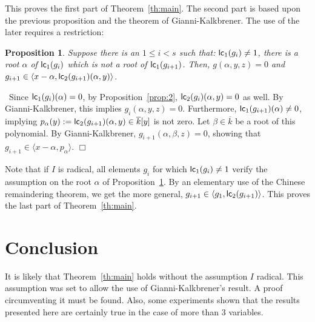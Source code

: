 \documentclass[a4paper,11pt]{article}
\newcommand{\conj}[1]{\ensuremath{{\overline{#1}}}}
\newcommand{\proof}{\noindent {\sc Proof:}~}
\newcommand{\foorp}{\hfill $\Box$}
\def\lc{\ensuremath{{\sf lc}}}
\def\l{\ensuremath{\langle}}
\def\r{\ensuremath{\rangle}}
\newtheorem{Prop}{Proposition}
\begin{document}
This proves the first part of Theorem~\ref{th:main}.
The second part is based upon the previous proposition and the theorem
of Gianni-Kalkbrener.
The use of the later requires a restriction:
\begin{Prop}\label{prop:3}
Suppose there is an $1 \le i<s$
such that: $\lc_1(g_i)\not=1$,
there is a root $\alpha$  of $\lc_1(g_i)$
which is not a root of $\lc_1(g_{i+1})$.
Then, $g(\alpha,y,z)=0$
and $g_{i+1} \in \l x-\alpha , \lc_2(g_{i+1})(\alpha,y)\r$.
\end{Prop}
\proof Since $\lc_1(g_i)(\alpha)=0$, by Proposition~\ref{prop:2},
$\lc_2(g_i)(\alpha,y)=0$ as well. By Gianni-Kalkbrener,
this implies $g_i(\alpha,y,z)=0$.
Furthermore,  $\lc_1(g_{i+1})(\alpha)\not=0$,
implying $p_{\alpha}(y):=\lc_2(g_{i+1})(\alpha,y)\in \conj{k}[y]$ is not zero. 
Let $\beta \in \conj{k}$ be a root of this polynomial.
By Gianni-Kalkbrener, $g_{i+1}(\alpha,\beta,z)=0$,
showing that $g_{i+1}\in \l x-\alpha,p_{\alpha}\r$.
\foorp
\medskip

Note that if $I$ is radical, all elements $g_i$
for which $\lc_1(g_i)\not=1$ verify the assumption
on the root $\alpha$
of  Proposition~\ref{prop:3}. By an elementary use
of the Chinese remaindering theorem, we get the more general,
$g_{i+1} \in \l g_1,\lc_2(g_{i+1})\r$.
This proves the last part of Theorem~\ref{th:main}.

\section*{Conclusion}

It is likely that Theorem~\ref{th:main}
holds without the assumption $I$ radical.
This assumption was set to allow the use
of Gianni-Kalkbrener's result. A proof
circumventing it must be found.
Also, some experiments shown  that the results presented
here are certainly true in the case of more than 3 variables.





\end{document}
